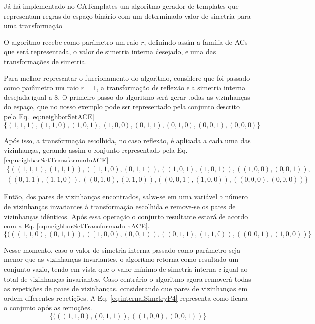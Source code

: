 Já há implementado no CATemplates um algoritmo gerador de templates que representam regras do espaço binário com um determinado valor de simetria para uma transformação.

O algoritmo recebe como parâmetro um raio $r$, definindo assim a família de ACs que será representada, o valor de simetria interna desejado, e uma das transformações de simetria.

Para melhor representar o funcionamento do algoritmo, considere que foi passado como parâmetro um raio $r = 1$, a transformação de reflexão e a simetria interna desejada igual a 8. O primeiro passo do algoritmo será gerar todas as vizinhanças do espaço, que no nosso exemplo pode ser representado pela conjunto descrito pela Eq. \eqref{eq:neighborSetACE}
\begin{equation}
\{(1,1,1),(1,1,0),
(1,0,1),(1,0,0),
(0,1,1),(0,1,0),
(0,0,1),(0,0,0)\}
\label{eq:neighborSetACE}
\end{equation}

Após isso, a transformação escolhida, no caso reflexão, é aplicada a cada uma das vizinhanças, gerando assim o conjunto representado pela Eq. \eqref{eq:neighborSetTransformadoACE}.  
\begin{equation}
\begin{split}
\{
((1,1,1),(1,1,1)),
((1,1,0),(0,1,1)),
((1,0,1),(1,0,1)),
((1,0,0),(0,0,1)),\\
((0,1,1),(1,1,0)),
((0,1,0),(0,1,0)),
((0,0,1),(1,0,0)),
((0,0,0),(0,0,0))\}
\label{eq:neighborSetTransformadoACE}
\end{split}
\end{equation}

Então, dos pares de vizinhanças encontrados, salva-se em uma variável o número de vizinhanças invariantes à transformação escolhida e remove-se os pares de vizinhanças idênticos. Após essa operação o conjunto resultante estará de acordo com a Eq. \eqref{eq:neighborSetTransformadoInACE}.
\begin{equation}
\{(((1,1,0),(0,1,1)),
((1,0,0),(0,0,1)),
((0,1,1),(1,1,0)),
((0,0,1),(1,0,0))\}
\label{eq:neighborSetTransformadoInACE}
\end{equation}

Nesse momento, caso o valor de simetria interna passado como parâmetro seja menor que as vizinhanças invariantes, o algoritmo retorna como resultado um conjunto vazio, tendo em vista que o valor mínimo de simetria interna é igual ao total de vizinhanças invariantes. Caso contrário o algoritmo agora removerá todas as repetições de pares de vizinhanças, considerando que pares de vizinhanças em ordem diferentes repetições. A Eq. \eqref{eq:internalSimetryP4} representa como ficara o conjunto após as remoções.
\begin{equation}
\{(((1,1,0),(0,1,1)), ((1,0,0),(0,0,1))\}
\label{eq:internalSimetryP4}
\end{equation}

